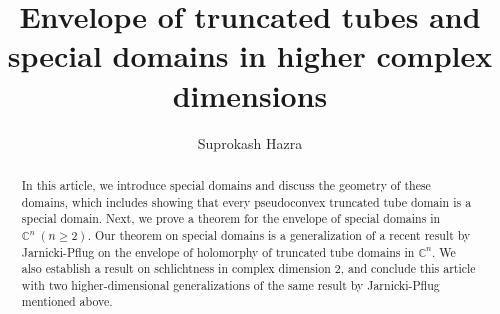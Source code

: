\documentclass[12pt,reqno, a4paper]{amsart}
\theoremstyle{definition}
\theoremstyle{definition}
\numberwithin{equation}{section}
\def\C{\mathbb{C}}                              %
\begin{document}
	
	\title[Envelope of truncated tubes and special domains]
	{Envelope of truncated tubes and special domains in higher complex dimensions}

	
	
	\author{Suprokash Hazra}
 	
	

	\begin{abstract}
	In this article, we introduce special domains and discuss the geometry of these domains, which includes showing that every pseudoconvex truncated tube domain is a special domain. Next, we prove a theorem for the envelope of special domains in $\C^n ~(n\geq 2)$. Our theorem on special domains is a generalization of a recent result by Jarnicki-Pflug on the envelope of holomorphy of truncated tube domains in $\C^n$. We also establish a result on schlichtness in complex dimension 2, and conclude this article with two  higher-dimensional generalizations of the same result by Jarnicki-Pflug mentioned above.
	\end{abstract}
	
	\maketitle
	
\end{document}
